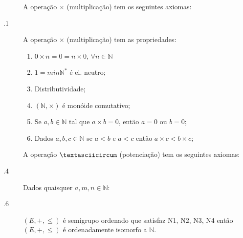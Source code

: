 \documentclass[11pt]{article}
\newcommand{\N}{\mathbb{N}}
\begin{document}
\begin{description}
  \item[] A operação $\times$ (multiplicação) tem os seguintes axiomas:
    \begin{description}
    \end{description}
  \item[.1] A operação $\times$ (multiplicação) tem as propriedades:
    \begin{enumerate}
      \item $0\times n=0=n\times 0$, $\forall n \in \N$
      \item $1=min \N^*$ é el. neutro;
      \item Distributividade;
      \item $(\N, \times)$ é monóide comutativo;
      \item Se $a,b \in \N$ tal que $a\times b=0$, então $a=0$ ou $b=0$;
      \item Dados $a,b,c \in \N$ se $a<b$ e $a<c$ então $a\times
        c<b\times c$;
    \end{enumerate}
  \item[] A operação $\textasciicircum$ (potenciação) tem os seguintes axiomas:
    \begin{description}
    \end{description}
  \item[.4] Dados quaisquer $a,m,n \in \N$:
    \begin{enumerate}
    \end{enumerate}
  \item[.6] $(E, +, \leq)$ é semigrupo ordenado que satisfaz N1, N2, N3, N4
    então $(E, +, \leq)$ é ordenadamente isomorfo a $\N$.
\end{description}
\end{document}
